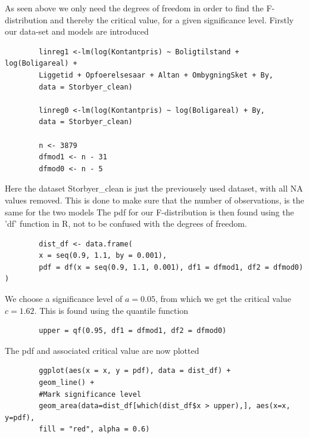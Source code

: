 \begin{example}
    As seen above we only need the degrees of freedom in order to find the F-distribution and thereby the critical value, for a given significance level.
    Firstly our data-set and models are introduced
    
    \begin{lstlisting}
        linreg1 <-lm(log(Kontantpris) ~ Boligtilstand + log(Boligareal) + 
        Liggetid + Opfoerelsesaar + Altan + OmbygningSket + By,
        data = Storbyer_clean)

        linreg0 <-lm(log(Kontantpris) ~ log(Boligareal) + By, 
        data = Storbyer_clean)
        
        n <- 3879
        dfmod1 <- n - 31
        dfmod0 <- n - 5
    \end{lstlisting}
    
    Here the dataset Storbyer\_clean is just the previousely used dataset, with all NA values removed. This is done to make sure that the number of observations, is the same for the two models
    The pdf for our F-distribution is then found using the 'df' function in R, not to be confused with the degrees of freedom. 
    
    \begin{lstlisting}
        dist_df <- data.frame(
        x = seq(0.9, 1.1, by = 0.001),
        pdf = df(x = seq(0.9, 1.1, 0.001), df1 = dfmod1, df2 = dfmod0)
)
    \end{lstlisting}
    
    We choose a significance level of $a = 0.05$, from which we get the critical value $c=1.62$. This is found using the quantile function
    
    \begin{lstlisting}
        upper = qf(0.95, df1 = dfmod1, df2 = dfmod0)
    \end{lstlisting}
    
    The pdf and associated critical value are now plotted
    
    \begin{lstlisting}
        ggplot(aes(x = x, y = pdf), data = dist_df) + 
        geom_line() +
        #Mark significance level
        geom_area(data=dist_df[which(dist_df$x > upper),], aes(x=x, y=pdf), 
        fill = "red", alpha = 0.6)
    \end{lstlisting}
    

\end{example}

